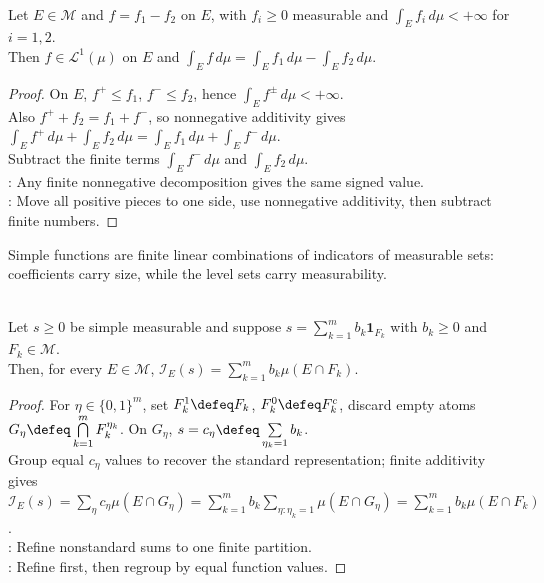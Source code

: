 \begin{proposition} \label{prop:signed-integral-independent-of-decomposition} \\
Let $E\in\mathcal{M}$ and $f=f_1-f_2$ on $E$, with $f_i\geq0$ measurable and $\int_Ef_i\,d\mu<+\infty$ for $i=1,2$.\\
Then $f\in\mathscr{L}^1(\mu)$ on $E$ and $\int_E f\,d\mu=\int_E f_1\,d\mu-\int_E f_2\,d\mu$.
\begin{proof}
On $E$, $f^+\leq f_1$, $f^-\leq f_2$, hence $\int_Ef^\pm\,d\mu<+\infty$.\\
Also $f^++f_2=f_1+f^-$, so nonnegative additivity gives $\int_E f^+\,d\mu+\int_E f_2\,d\mu=\int_E f_1\,d\mu+\int_E f^-\,d\mu$.\\
Subtract the finite terms $\int_Ef^-\,d\mu$ and $\int_Ef_2\,d\mu$.\\
: Any finite nonnegative decomposition gives the same signed value.\\
: Move all positive pieces to one side, use nonnegative additivity, then subtract finite numbers.
\end{proof}
\end{proposition}

Simple functions are finite linear combinations of indicators of measurable sets: coefficients carry size, while the level sets carry measurability.

\begin{lemma} \label{lem:simple-integral-refinement} \\
Let $s\geq0$ be simple measurable and suppose $s=\sum\limits_{k=1}^{m}b_k\mathbf{1}_{F_k}$ with $b_k\geq0$ and $F_k\in\mathcal{M}$.\\
Then, for every $E\in\mathcal{M}$, $\mathcal{I}_E(s)=\sum\limits_{k=1}^{m}b_k\mu(E\cap F_k)$.
\begin{proof}
For $\eta\in\{0,1\}^m$, set $F_k^1\defeq F_k$, $F_k^0\defeq F_k^c$, discard empty atoms $G_\eta\defeq\bigcap\limits_{k=1}^{m}F_k^{\eta_k}$. On $G_\eta$, $s=c_\eta\defeq\sum\limits_{\eta_k=1}b_k$.\\
Group equal $c_\eta$ values to recover the standard representation; finite additivity gives\\
$\mathcal{I}_E(s)=\sum\limits_\eta c_\eta\mu(E\cap G_\eta) =\sum\limits_{k=1}^{m}b_k\sum\limits_{\eta:\eta_k=1}\mu(E\cap G_\eta) =\sum\limits_{k=1}^{m}b_k\mu(E\cap F_k)$.\\
: Refine nonstandard sums to one finite partition.\\
: Refine first, then regroup by equal function values.
\end{proof}
\end{lemma}


